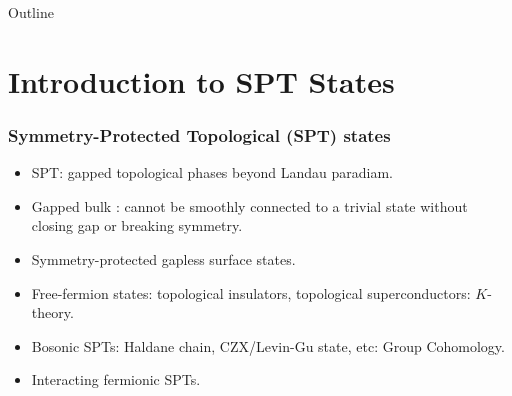 \documentclass[xcolor=table, 11pt, aspectratio=1610]{beamer}
\begin{document}
\begin{frame}{Outline}
      \tableofcontents
\end{frame}


\section{Introduction to SPT States}

\begin{frame}
  \frametitle{Symmetry-Protected Topological (SPT) states}
\begin{itemize}
\item SPT: gapped topological phases beyond Landau paradiam.
\item Gapped bulk : cannot be smoothly connected to a trivial state without closing gap or breaking symmetry.
\item Symmetry-protected gapless surface states.
\item Free-fermion states: topological insulators, topological superconductors: $K$-theory.
\item Bosonic SPTs: Haldane chain, CZX/Levin-Gu state, etc: Group Cohomology.
\item Interacting fermionic SPTs.
\end{itemize}
\end{frame}

\end{document}
